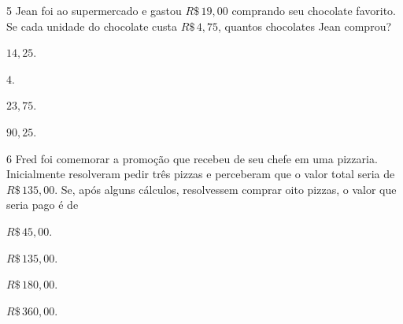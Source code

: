 \num{5}  Jean foi ao supermercado e gastou $R\$\,19,00$ comprando seu chocolate
favorito. Se cada unidade do chocolate custa $R\$\,4,75$, quantos
chocolates Jean comprou?

\begin{multicols}{2}
\begin{escolha}
\item $14,25$.
\item $4$.
\item $23,75$.
\item $90,25$.
\end{escolha}
\end{multicols}



\num{6}  Fred foi comemorar a promoção que recebeu de seu chefe em uma
pizzaria. Inicialmente resolveram pedir três pizzas e perceberam que o
valor total seria de $R\$\,135,00$. Se, após alguns cálculos, resolvessem
comprar oito pizzas, o valor que seria pago é de

\begin{multicols}{2}
\begin{escolha}
\item $R\$\,45,00$.
\item $R\$\,135,00$.
\item $R\$\,180,00$.
\item $R\$\,360,00$.
\end{escolha}
\end{multicols}


